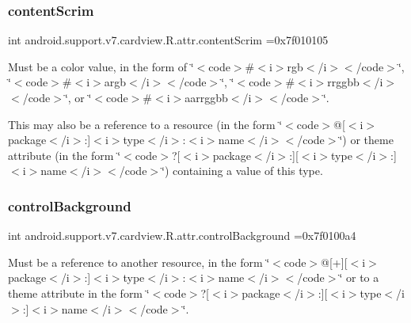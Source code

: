 \subsubsection{\texorpdfstring{content\+Scrim}{contentScrim}}
{\footnotesize\ttfamily int android.\+support.\+v7.\+cardview.\+R.\+attr.\+content\+Scrim =0x7f010105\hspace{0.3cm}{\ttfamily [static]}}

Must be a color value, in the form of \char`\"{}$<$code$>$\#$<$i$>$rgb$<$/i$>$$<$/code$>$\char`\"{}, \char`\"{}$<$code$>$\#$<$i$>$argb$<$/i$>$$<$/code$>$\char`\"{}, \char`\"{}$<$code$>$\#$<$i$>$rrggbb$<$/i$>$$<$/code$>$\char`\"{}, or \char`\"{}$<$code$>$\#$<$i$>$aarrggbb$<$/i$>$$<$/code$>$\char`\"{}. 

This may also be a reference to a resource (in the form \char`\"{}$<$code$>$@\mbox{[}$<$i$>$package$<$/i$>$\+:\mbox{]}$<$i$>$type$<$/i$>$\+:$<$i$>$name$<$/i$>$$<$/code$>$\char`\"{}) or theme attribute (in the form \char`\"{}$<$code$>$?\mbox{[}$<$i$>$package$<$/i$>$\+:\mbox{]}\mbox{[}$<$i$>$type$<$/i$>$\+:\mbox{]}$<$i$>$name$<$/i$>$$<$/code$>$\char`\"{}) containing a value of this type. \mbox{\label{classandroid_1_1support_1_1v7_1_1cardview_1_1R_1_1attr_a9788ead14036f93aa243770c842b1fd0}} 
\subsubsection{\texorpdfstring{control\+Background}{controlBackground}}
{\footnotesize\ttfamily int android.\+support.\+v7.\+cardview.\+R.\+attr.\+control\+Background =0x7f0100a4\hspace{0.3cm}{\ttfamily [static]}}

Must be a reference to another resource, in the form \char`\"{}$<$code$>$@\mbox{[}+\mbox{]}\mbox{[}$<$i$>$package$<$/i$>$\+:\mbox{]}$<$i$>$type$<$/i$>$\+:$<$i$>$name$<$/i$>$$<$/code$>$\char`\"{} or to a theme attribute in the form \char`\"{}$<$code$>$?\mbox{[}$<$i$>$package$<$/i$>$\+:\mbox{]}\mbox{[}$<$i$>$type$<$/i$>$\+:\mbox{]}$<$i$>$name$<$/i$>$$<$/code$>$\char`\"{}. \mbox{\label{classandroid_1_1support_1_1v7_1_1cardview_1_1R_1_1attr_ae86ff72f000a932b1608cfcce46c61a4}} 
